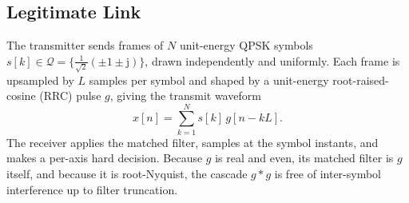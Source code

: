 \subsection{Legitimate Link}
\label{sec:link}
The transmitter sends frames of $N$ unit-energy QPSK symbols $s[k]\in\mathcal{Q}=\{\tfrac{1}{\sqrt2}(\pm1\pm\mathrm{j})\}$, drawn independently and uniformly.
Each frame is upsampled by $L$ samples per symbol and shaped by a unit-energy root-raised-cosine (RRC) pulse $g$, giving the transmit waveform
\begin{equation}
x[n]=\sum_{k=1}^{N} s[k]\,g[n-kL].
\label{eq:tx}
\end{equation}
The receiver applies the matched filter, samples at the symbol instants, and makes a per-axis hard decision.
Because $g$ is real and even, its matched filter is $g$ itself, and because it is root-Nyquist, the cascade $g*g$ is free of inter-symbol interference up to filter truncation.

